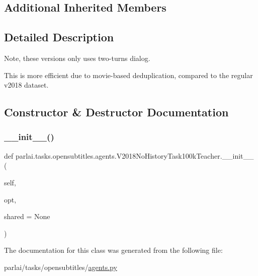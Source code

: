 \subsection*{Additional Inherited Members}


\subsection{Detailed Description}
\begin{DoxyVerb}Note, these versions only uses two-turns dialog.

This is more efficient due to movie-based deduplication, compared to the regular
v2018 dataset.
\end{DoxyVerb}
 

\subsection{Constructor \& Destructor Documentation}
\mbox{\label{classparlai_1_1tasks_1_1opensubtitles_1_1agents_1_1V2018NoHistoryTask100kTeacher_ac0ca125ef0f17779db17f4ad044294e6}} 
\subsubsection{\texorpdfstring{\+\_\+\+\_\+init\+\_\+\+\_\+()}{\_\_init\_\_()}}
{\footnotesize\ttfamily def parlai.\+tasks.\+opensubtitles.\+agents.\+V2018\+No\+History\+Task100k\+Teacher.\+\_\+\+\_\+init\+\_\+\+\_\+ (\begin{DoxyParamCaption}\item[{}]{self,  }\item[{}]{opt,  }\item[{}]{shared = {\ttfamily None} }\end{DoxyParamCaption})}



The documentation for this class was generated from the following file\+:\begin{DoxyCompactItemize}
\item 
parlai/tasks/opensubtitles/\hyperlink{parlai_2tasks_2opensubtitles_2agents_8py}{agents.\+py}\end{DoxyCompactItemize}
